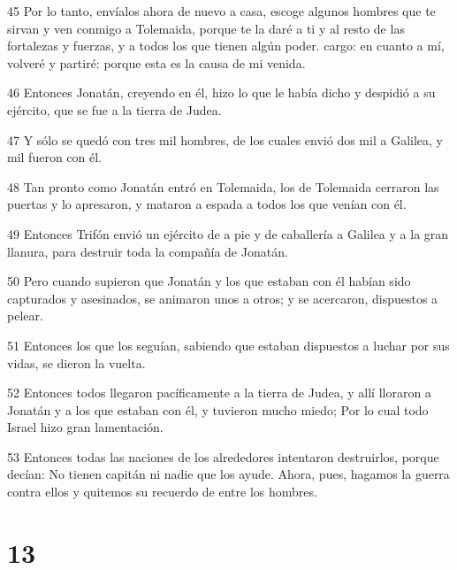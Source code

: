 \par 45 Por lo tanto, envíalos ahora de nuevo a casa, escoge algunos hombres que te sirvan y ven conmigo a Tolemaida, porque te la daré a ti y al resto de las fortalezas y fuerzas, y a todos los que tienen algún poder. cargo: en cuanto a mí, volveré y partiré: porque esta es la causa de mi venida.
\par 46 Entonces Jonatán, creyendo en él, hizo lo que le había dicho y despidió a su ejército, que se fue a la tierra de Judea.
\par 47 Y sólo se quedó con tres mil hombres, de los cuales envió dos mil a Galilea, y mil fueron con él.
\par 48 Tan pronto como Jonatán entró en Tolemaida, los de Tolemaida cerraron las puertas y lo apresaron, y mataron a espada a todos los que venían con él.
\par 49 Entonces Trifón envió un ejército de a pie y de caballería a Galilea y a la gran llanura, para destruir toda la compañía de Jonatán.
\par 50 Pero cuando supieron que Jonatán y los que estaban con él habían sido capturados y asesinados, se animaron unos a otros; y se acercaron, dispuestos a pelear.
\par 51 Entonces los que los seguían, sabiendo que estaban dispuestos a luchar por sus vidas, se dieron la vuelta.
\par 52 Entonces todos llegaron pacíficamente a la tierra de Judea, y allí lloraron a Jonatán y a los que estaban con él, y tuvieron mucho miedo; Por lo cual todo Israel hizo gran lamentación.
\par 53 Entonces todas las naciones de los alrededores intentaron destruirlos, porque decían: No tienen capitán ni nadie que los ayude. Ahora, pues, hagamos la guerra contra ellos y quitemos su recuerdo de entre los hombres.

\chapter{13}

